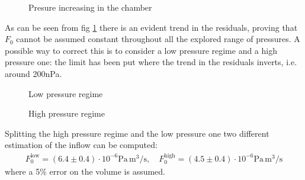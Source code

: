 \documentclass[11pt,a4 paper]{article}
\begin{document}
\begin{figure}[H]
  \centering
   \hspace{-0.05\textwidth}
  \caption{Presure increasing in the chamber}
  \label{fig:increase_all}
\end{figure}

As can be seen from fig \ref{fig:increase_all} there is an evident trend in the residuals, proving that $F_0$ cannot be assumed constant throughout all the explored range of pressures. A possible way to correct this is to consider a low pressure regime and a high pressure one: the limit has been put where the trend in the residuals inverts, i.e. around 200\si{\nano\pascal}.
\begin{figure}[H]
  \centering
   \hspace{-0.05\textwidth}
  \caption{Low pressure regime}
  \label{fig:increase_lowP}
\end{figure}
\begin{figure}[H]
  \centering
   \hspace{-0.05\textwidth}
  \caption{High pressure regime}
  \label{fig:increase_highP}
\end{figure}


Splitting the high pressure regime and the low pressure one two different estimation of the inflow can be computed:
\begin{gather*}
  F_0^\text{low} = (6.4 \pm 0.4) \cdot 10^{-6} \si{\pascal}\, \si{\metre^3}/\si{\second}, \quad
  F_0^\text{high} = (4.5 \pm 0.4) \cdot 10^{-6} \si{\pascal}\, \si{\metre^3}/\si{\second}
\end{gather*}
where a 5\% error on the volume is assumed.
\end{document}

